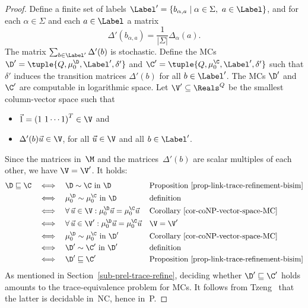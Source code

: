 \begin{proof}
\noindent
Define a finite set of labels $\Label' = \{b_{\alpha, a} \mid \alpha \in \Sigma, \ a \in \Label \}$, and for each $\alpha \in \Sigma$ and each $a \in \Label$ a matrix
\[
 \Delta'(b_{\alpha, a}) = \frac{1}{|\Sigma|} \Delta_\alpha(a).
\]
The matrix $\sum_{b \in \Label'} \Delta'(b)$ is stochastic.
Define the MCs $\D' = \tuple{Q,\mu^{\D}_{0},\Label',\delta'}$
and $\C' = \tuple{Q,\mu^{\C}_{0},\Label',\delta'}$
such that $\delta'$ induces the transition matrices $\Delta'(b)$ for all $b \in \Label'$.
The MCs $\D'$ and~$\C'$ are computable in logarithmic space.
Let $\V' \subseteq \Reals^{Q}$ be the smallest column-vector space such that
\begin{itemize}
\item
$\vec{1} = {(1 \ 1 \cdots 1)}^T \in \V$ and
\item $\Delta'(b) \vec{u} \in \V$, for all $\vec{u} \in \V$ and all $b \in \Label'$.
\end{itemize}
Since the matrices in~$\M$ and the matrices~$\Delta'(b)$ are scalar multiples of each other, we have $\V = \V'$.
It holds:
\begin{align*}
\D \sqsubseteq \C \quad
& \Longleftrightarrow\quad \D \sim \C \text{ in~$\D$}
 && \text{Proposition~\ref{prop-link-trace-refinement-bisim}} \\
& \Longleftrightarrow\quad \mu^\D_{0} \sim \mu^{\C}_{0} \text{ in~$\D$}
 && \text{definition} \\
& \Longleftrightarrow\quad \forall\, \vec{u} \in \V : \mu^{\D}_{0} \vec{u} = \mu^{\C}_{0} \vec{u}
 && \text{Corollary~\ref{cor-coNP-vector-space-MC}} \\
& \Longleftrightarrow\quad \forall\, \vec{u} \in \V' : \mu^{\D}_{0} \vec{u} = \mu^{\C}_{0} \vec{u}
 && \V = \V' \\
& \Longleftrightarrow\quad \mu^\D_{0} \sim \mu^{\C}_{0} \text{ in~$\D'$}
 && \text{Corollary~\ref{cor-coNP-vector-space-MC}} \\
& \Longleftrightarrow\quad \D' \sim \C' \text{ in~$\D'$}
 && \text{definition} \\
& \Longleftrightarrow\quad \D' \sqsubseteq \C'
 && \text{Proposition~\ref{prop-link-trace-refinement-bisim}}
\end{align*}
As mentioned in Section~\ref{sub-prel-trace-refine},
deciding whether $\D' \sqsubseteq \C'$ holds amounts to the trace-equivalence problem for MCs.
It follows from Tzeng~\cite{Tzeng96} that the latter is decidable in~{\sf NC}, hence in~{\sf P}.
\end{proof}

